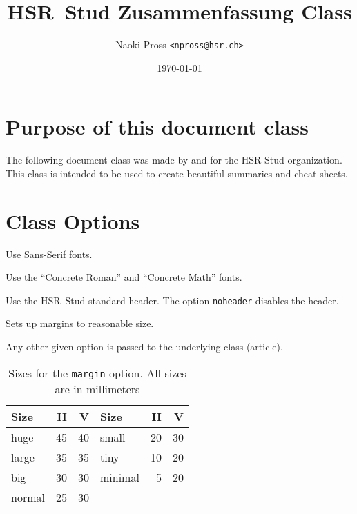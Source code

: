 \documentclass[concrete, header, margin=huge]{hsrzf}
\title{\textcolor{hsr-blue}{HSR}--Stud Zusammenfassung Class}
\author{Naoki Pross \texttt{<npross@hsr.ch>}}
\date{\today}
\begin{document}
\maketitle
\tableofcontents

\section{Purpose of this document class}
The following document class was made by and for the HSR-Stud organization. This class is intended to be used to create beautiful summaries and cheat sheets.

\section{Class Options}
\begin{description}[align=right]
  \item[\tt sans] Use Sans-Serif fonts.
  \item[\tt concrete] Use the ``Concrete Roman'' and ``Concrete Math'' fonts.
  \item[\tt header] Use the HSR--Stud standard header. The option {\tt noheader} disables the header.
  \item[\tt margin=<size>] Sets up margins to reasonable size.
  \item[\tt *] Any other given option is passed to the underlying class (article).
\end{description}

\begin{table}\centering
\begin{tabular}{l r r l r r}
  \toprule
  Size & H & V & Size & H & V \\
  \midrule
  huge    & 45 & 40 & small   & 20 & 30 \\
  large   & 35 & 35 & tiny    & 10 & 20 \\
  big     & 30 & 30 & minimal &  5 & 20 \\
  normal  & 25 & 30 \\
  \bottomrule
\end{tabular}
\caption{Sizes for the {\tt margin} option. All sizes are in millimeters}
\end{table}
\end{document}
